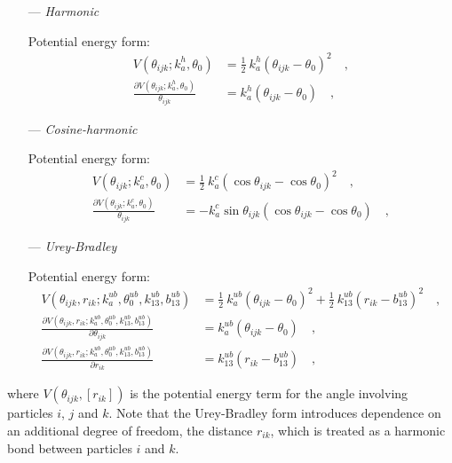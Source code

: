 \documentclass[10pt,a4paper]{report}
\numberwithin{equation}{section}
\begin{document}
\begin{itemize}
\item [---] \textit{Harmonic}
  \par
  Potential energy form:
  \begin{align}
    \label{eq:harmonic-angle-energy}
    V(\theta_{ijk}; k_a^h, \theta_0) & = \frac{1}{2} \ k_a^h (\theta_{ijk} - \theta_0)^2 \quad , \\ \nonumber
    \frac{\partial V(\theta_{ijk}; k_a^h, \theta_0)}{\theta_{ijk}} & = k_a^h (\theta_{ijk} - \theta_0) \quad ,
  \end{align}
  
\item [---] \textit{Cosine-harmonic}
  \par
  Potential energy form:
  \begin{align}
    \label{eq:cosine-angle-energy}
    V(\theta_{ijk}; k_a^c, \theta_0) & = \frac{1}{2} \ k_a^c (\cos{\theta_{ijk}} - \cos\theta_0)^2 \quad , \\ \nonumber
    \frac{\partial V(\theta_{ijk}; k_a^c, \theta_0)}{\theta_{ijk}} & = -k_a^c \sin{\theta_{ijk}}(\cos{\theta_{ijk}} - \cos\theta_0) \quad ,
  \end{align}

\item [---] \textit{Urey-Bradley}
  \par
  Potential energy form:
  \begin{align}
    \label{eq:ub-angle-energy}
    V(\theta_{ijk},r_{ik}; k_a^{ub}, \theta^{ub}_0,k_{13}^{ub},b_{13}^{ub}) & = \frac{1}{2} \ k_a^{ub} (\theta_{ijk} - \theta_0)^2 + \frac{1}{2}  \ k_{13}^{ub} (r_{ik} - b_{13}^{ub})^2 \quad , \\ \nonumber
    \frac{\partial V(\theta_{ijk},r_{ik}; k_a^{ub}, \theta^{ub}_0,k_{13}^{ub},b_{13}^{ub})}{\partial \theta_{ijk}} & = k_a^{ub} (\theta_{ijk} - \theta_0) \quad , \\ \nonumber
    \frac{\partial V(\theta_{ijk},r_{ik}; k_a^{ub}, \theta^{ub}_0,k_{13}^{ub},b_{13}^{ub})}{\partial r_{ik}}  & = k_{13}^{ub} (r_{ik} - b_{13}^{ub}) \quad ,
  \end{align}

\end{itemize}  
\noindent
where $V(\theta_{ijk},[r_{ik}])$ is the potential energy term for the angle involving particles $i$, $j$ and $k$.
Note that the Urey-Bradley form introduces dependence on an additional degree of freedom, the distance $r_{ik}$, which is treated as a harmonic bond between particles $i$ and $k$.
\end{document}
